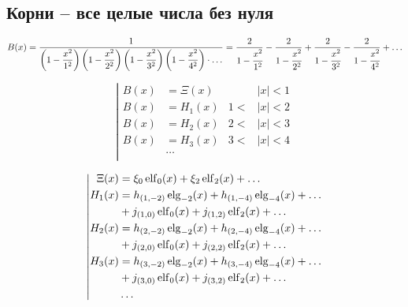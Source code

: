 
\subsection{Корни -- все целые числа без нуля}

\begin{equation*} \begin{aligned}
B(x) &=
  \frac{1}{
  \left(1 - \displaystyle \frac{x^2}{1^2} \right)
  \left(1 - \displaystyle \frac{x^2}{2^2} \right)
  \left(1 - \displaystyle \frac{x^2}{3^2} \right)
  \left(1 - \displaystyle \frac{x^2}{4^2} \right)
  \cdot \ldots
  }
= \frac{2}{1 - \cfrac{x^2}{1^2}}
- \frac{2}{1 - \cfrac{x^2}{2^2}}
+ \frac{2}{1 - \cfrac{x^2}{3^2}}
- \frac{2}{1 - \cfrac{x^2}{4^2}}
+ \ldots \\
\end{aligned} \end{equation*}

\begin{equation*} \left| \begin{aligned}
B(x) &= \Xi(x) & 
&|x| < 1 \\
%
B(x) &= H_1(x) & 
1 < &|x| < 2 \\
%
B(x) &= H_2(x) & 
2 < &|x| < 3 \\
%
B(x) &= H_3(x) &
3 < &|x| < 4 \\
&\ldots & & \\
\end{aligned} \right. \end{equation*}

\begin{equation*} \left| \begin{aligned}
\Xi(x) &=
  \xi_0 \elf_0(x)
+ \xi_2 \elf_2(x)  
+ \ldots \\
%
H_1(x) &= 
  h_{(1,-2)} \elg_{-2}(x)
+ h_{(1,-4)} \elg_{-4}(x)
+ \ldots \\ &
+ j_{(1,0)} \elf_0(x)
+ j_{(1,2)} \elf_2(x)
+ \ldots \\
%
H_2(x) &= 
  h_{(2,-2)} \elg_{-2}(x)
+ h_{(2,-4)} \elg_{-4}(x)
+ \ldots \\ &
+ j_{(2,0)} \elf_0(x)
+ j_{(2,2)} \elf_2(x)
+ \ldots \\
%
H_3(x) &= 
  h_{(3,-2)} \elg_{-2}(x)
+ h_{(3,-4)} \elg_{-4}(x)
+ \ldots \\ &
+ j_{(3,0)} \elf_0(x)
+ j_{(3,2)} \elf_2(x)
+ \ldots \\
%
&\ldots \\
\end{aligned} \right. \end{equation*}

